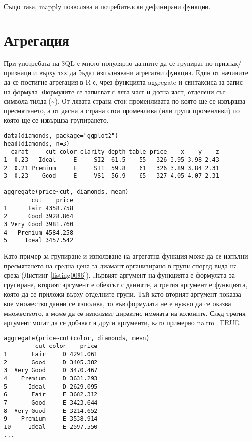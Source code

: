 Също така, mapply позволява и потребителски дефинирани функции.

\section{Агрегация}

При употребата на SQL е много популярно данните да се групират по признак/признаци и върху тях да бъдат изпълнявани агрегатни функции. Един от начините да се постигне агрегация в R е, чрез функцията aggregate и синтаксиса за запис на формула. Формулите се записват с лява част и дясна част, отделени със символа тилда (\textasciitilde). От лявата страна стои променливата по която ще се извършва пресмятането, а от дясната страна стои променлива (или група променливи) по която ще се извършва групирането. 

\begin{lstlisting}[caption=Групиране на данни, label=listing0096]
data(diamonds, package="ggplot2")
head(diamonds, n=3)
  carat     cut color clarity depth table price    x    y    z
1  0.23   Ideal     E     SI2  61.5    55   326 3.95 3.98 2.43
2  0.21 Premium     E     SI1  59.8    61   326 3.89 3.84 2.31
3  0.23    Good     E     VS1  56.9    65   327 4.05 4.07 2.31

aggregate(price~cut, diamonds, mean)
        cut    price
1      Fair 4358.758
2      Good 3928.864
3 Very Good 3981.760
4   Premium 4584.258
5     Ideal 3457.542
\end{lstlisting}

Като пример за групиране и използване на агрегатна функция може да се изпълни пресмятането на средна цена за диамант организирано в групи според вида на среза (Листинг \ref{listing0096}). Първият аргумент на функцията е формулата за групиране, вторият аргумент е обектът с данните, а третия аргумент е функцията, която да се приложи върху отделните групи. Тъй като вторият аргумент показва кое множество данни се използва, то във формулата не е нужно да се оказва множеството, а може да се използват директно имената на колоните. След третия аргумент могат да се добавят и други аргументи, като примерно na.rm=TRUE. 

\begin{lstlisting}[caption=Групиране по повече от една колона, label=listing0097]
aggregate(price~cut+color, diamonds, mean)
         cut color    price
1       Fair     D 4291.061
2       Good     D 3405.382
3  Very Good     D 3470.467
4    Premium     D 3631.293
5      Ideal     D 2629.095
6       Fair     E 3682.312
7       Good     E 3423.644
8  Very Good     E 3214.652
9    Premium     E 3538.914
10     Ideal     E 2597.550
...
\end{lstlisting}


